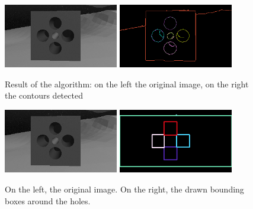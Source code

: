 \begin{figure}[H]
	\centering
	\includegraphics[width=5.0cm]{BoundBox_sourceOnlyPolig}
	\qquad
	\includegraphics[width=5.0cm]{BoundBox_resultOnlyPolig}
	\caption[Result of bounding box detection]{Result of the algorithm: on the left the original image, on the right the contours detected}
	\label{fig:BoundBoxresultOnlyPolig}
\end{figure}

\begin{figure}[H]
	\centering
	\includegraphics[width=5.0cm]{BoundBox_SourceOnlyRect}
	\qquad
	\includegraphics[width=5.0cm]{BoundBox_resultOnlyRect}
	\caption[Another result of bounding box detection]{On the left, the original image. On the right, the drawn bounding boxes around the holes.}
	\label{fig:BoundBoxresultOnlyRect}
\end{figure}

